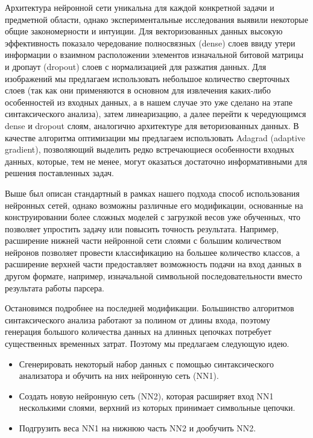 \documentclass[14pt]{matmex-diploma-custom}
\begin{document}
Архитектура нейронной сети уникальна для каждой конкретной задачи и предметной области, однако экспериментальные исследования выявили некоторые общие закономерности и интуиции. Для векторизованных данных высокую эффективность показало чередование полносвязных (dense) слоев ввиду утери информации о взаимном расположении элементов изначальной битовой матрицы и дропаут (dropout) слоев с нормализацией для разжатия данных. Для изображений мы предлагаем использовать небольшое количество сверточных слоев (так как они применяются в основном для извлечения каких-либо особенностей из входных данных, а в нашем случае это уже сделано на этапе синтаксического анализа), затем линеаризацию, а далее перейти к чередующимся dense и dropout слоям, аналогично архитектуре для веторизованных данных. В качестве алгоритма оптимизации мы предлагаем использовать Adagrad (adaptive gradient), позволяющий выделить редко встречающиеся особенности входных данных, которые, тем не менее, могут оказаться достаточно информативными для решения поставленных задач.

Выше был описан стандартный в рамках нашего подхода способ использования нейронных сетей, однако возможны различные его модификации, основанные на конструировании более сложных моделей с загрузкой весов уже обученных, что позволяет упростить задачу или повысить точность результата. Например, расширение нижней части нейронной сети слоями с большим количеством нейронов позволяет провести классификацию на большее количество классов, а расширение верхней части предоставляет возможность подачи на вход данных в другом формате, например, изначальной символьной последовательности вместо результата работы парсера.

Остановимся подробнее на последней модификации. Большинство алгоритмов синтаксического анализа работают за полином от длины входа, поэтому генерация большого количества данных на длинных цепочках потребует существенных временных затрат. Поэтому мы предлагаем следующую идею.
\begin{itemize}
    \item Сгенерировать некоторый набор данных с помощью синтаксического анализатора и обучить на них нейронную сеть (NN1).
    \item Создать новую нейронную сеть (NN2), которая расширяет вход NN1 несколькими слоями, верхний из которых принимает символьные цепочки.
    \item Подгрузить веса NN1 на нижнюю часть NN2 и дообучить NN2.
\end{itemize}
\end{document}
